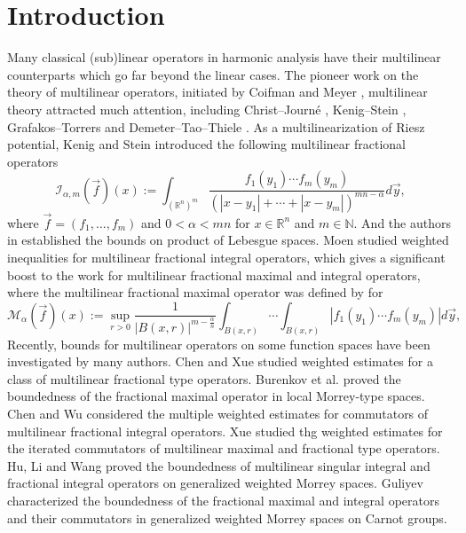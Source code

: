 \documentclass[11pt, twoside, leqno]{article}
\begin{document}
\section{Introduction}\label{sec1}
Many classical (sub)linear operators in harmonic analysis have their multilinear counterparts which go far beyond the linear cases. The pioneer work on the theory of multilinear operators, initiated by Coifman and Meyer \cite{Coifman1975On,Coifman1978commutators}, multilinear theory attracted much attention, including Christ--Journ\'{e} \cite{Christ1987Polynomial}, Kenig--Stein \cite{Kenig1999Multilinear}, Grafakos--Torrers \cite{Grafakos2002Multilinear,Grafakos2002Maximal} and Demeter--Tao--Thiele \cite{Demeter2008Maximal}. As a multilinearization of  Riesz potential, Kenig and Stein \cite{Kenig1999Multilinear} introduced the following multilinear fractional operators
$$\mathcal{I}_{\alpha,m}(\vec{f})(x):=\int_{(\mathbb{R}^{n})^{m}}\frac{f_{1}(y_{1})\cdots f_{m}(y_{m})}{(|x-y_{1}|+\cdots+|x-y_{m}|)^{mn-\alpha}}d{\vec y},$$
where $\vec{f}=(f_{1},\ldots,f_{m})$ and $0<\alpha<mn$ for  $x\in \mathbb{R}^{n}$ and $m\in\mathbb{N}$. And the authors in \cite{Kenig1999Multilinear} established the bounds on product of Lebesgue spaces. Moen \cite{Moen} studied weighted inequalities for multilinear fractional integral operators, which gives a significant boost to the work for multilinear fractional maximal and integral operators, where the  multilinear fractional maximal operator was defined  by  for 
\begin{equation*}
{{\mathcal M}_\alpha }(\vec f)(x) := \mathop {\sup }\limits_{r > 0} \frac{1}{|B(x,r)|^{m-\frac{\alpha}{n}}}\int_{B(x,r)}\cdots\int_{B(x,r)} | {{f_1}({y_1})}\cdots {{f_m}({y_m})} |d{\vec y},
\end{equation*}
Recently, bounds for multilinear operators on some function spaces have been investigated by many authors. Chen and Xue \cite{Chen-Xue} studied weighted estimates for a class of
multilinear fractional type operators. Burenkov et al. \cite{Gu9} proved the boundedness of the fractional maximal operator in local Morrey-type spaces. Chen and Wu \cite{chen-wu} considered the multiple weighted estimates for commutators of multilinear fractional integral operators. Xue \cite{xue7} studied thg weighted estimates for the iterated commutators of multilinear maximal and fractional type operators. Hu, Li and Wang \cite{Hu-Li-Wang,Hu-Wang} proved the boundedness of multilinear singular integral and fractional integral operators on generalized weighted Morrey spaces. Guliyev \cite{Gu7,Gu8} characterized the boundedness of the fractional maximal and integral operators and their commutators in generalized weighted Morrey spaces on Carnot groups.
\end{document}

